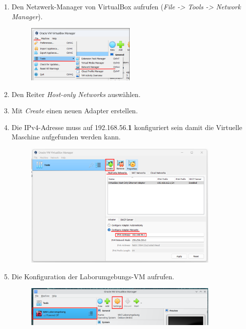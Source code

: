 \begin{enumerate}
    \item Den Netzwerk-Manager von VirtualBox aufrufen (\textit{File -> Tools -> Network Manager}).
    \begin{figure}[!hbt]
        \centering
        \includegraphics[width=0.5\textwidth]{./images/network-settings.png}
    \end{figure}
    \item Den Reiter \textit{Host-only Networks} auswählen.
    \item Mit \textit{Create} einen neuen Adapter erstellen.
    \item Die IPv4-Adresse muss auf 192.168.56.\textbf{1} konfiguriert sein damit die Virtuelle Maschine aufgefunden werden kann.
    \begin{figure}[!hbt]
        \centering
        \includegraphics[width=0.9\textwidth]{./images/new-ho-network.png}
    \end{figure}
    \item Die Konfiguration der Laborumgebungs-VM aufrufen.
    \begin{figure}[!hbt]
        \centering
        \includegraphics[width=0.9\textwidth]{./images/vm-settings.png}

\end{figure}
\end{enumerate}
